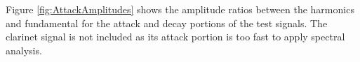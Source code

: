 		Figure \ref{fig:AttackAmplitudes} shows the amplitude ratios between the harmonics and fundamental for the
		attack and decay portions of the test signals. The clarinet signal is not included as its attack portion is
		too fast to apply spectral analysis.

		\begin{figure}[h!]
			\centering
			\quad


\end{figure}

